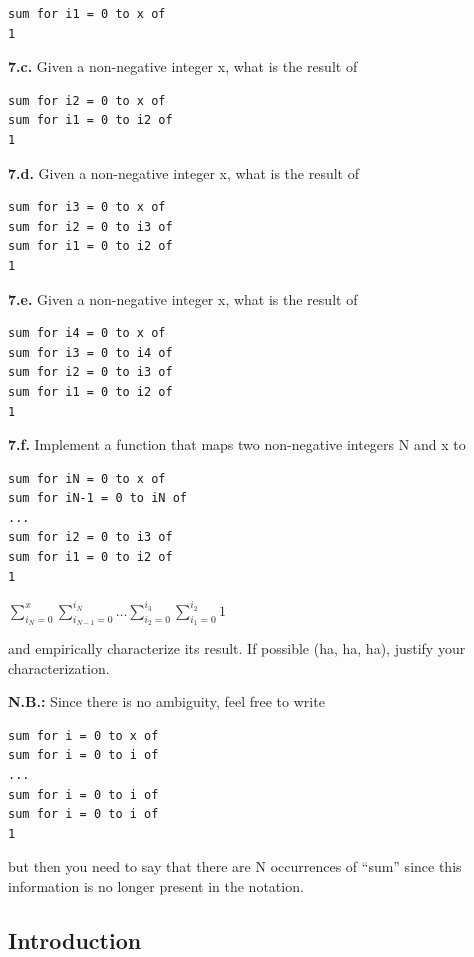 \documentclass[12pt]{article}
\begin{document}
\begin{verbatim}
sum for i1 = 0 to x of
1
\end{verbatim}

\textbf{7.c.} Given a non-negative integer x, what is the result of

\begin{verbatim}
sum for i2 = 0 to x of
sum for i1 = 0 to i2 of
1
\end{verbatim}

\textbf{7.d.} Given a non-negative integer x, what is the result of

\begin{verbatim}
sum for i3 = 0 to x of
sum for i2 = 0 to i3 of
sum for i1 = 0 to i2 of
1
\end{verbatim}

\textbf{7.e.} Given a non-negative integer x, what is the result of

\begin{verbatim}
sum for i4 = 0 to x of
sum for i3 = 0 to i4 of
sum for i2 = 0 to i3 of
sum for i1 = 0 to i2 of
1
\end{verbatim}

\textbf{7.f.} Implement a function that maps two non-negative integers N and x to

\begin{verbatim}
sum for iN = 0 to x of
sum for iN-1 = 0 to iN of
...
sum for i2 = 0 to i3 of
sum for i1 = 0 to i2 of
1
\end{verbatim}

$\displaystyle\sum_{i_{N}=0}^{x}\sum_{i_{N-1}=0}^{i_{N}}\dots\sum_{i_{2}=0}^{i_{3}}\sum_{i_{1}=0}^{i_{2}}1$

and empirically characterize its result. If possible (ha, ha, ha), justify your
characterization.

\textbf{N.B.:} Since there is no ambiguity, feel free to write

\begin{verbatim}
sum for i = 0 to x of
sum for i = 0 to i of
...
sum for i = 0 to i of
sum for i = 0 to i of
1
\end{verbatim}

but then you need to say that there are N occurrences of ``sum'' since this
information is no longer present in the notation.


\subsection{Introduction}
\end{document}
